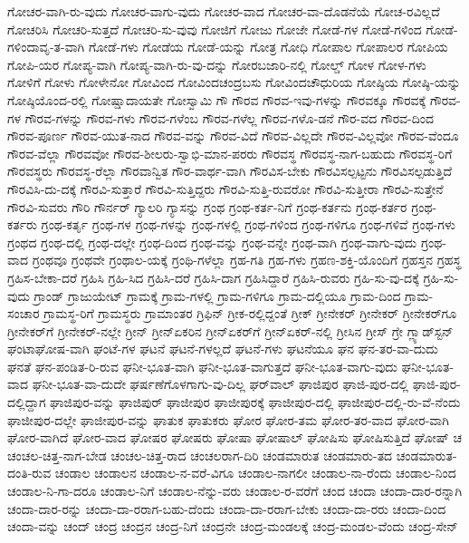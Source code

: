 {ಗೋಚರ-ವಾಗಿ-ರು-ವುದು
ಗೋಚರ-ವಾಗು-ವುದು
ಗೋಚರ-ವಾದ
ಗೋಚರ-ವಾ-ದೊಡನೆಯೆ
ಗೋಚ-ರವಿಲ್ಲದೆ
ಗೋಚರಿಸಿ
ಗೋಚರಿ-ಸುತ್ತದೆ
ಗೋಚರಿ-ಸು-ವುವು
ಗೋಜಿಗೆ
ಗೋಜು
ಗೋಜೇ
ಗೋಡೆ-ಗಳ
ಗೋಡೆ-ಗಳಿಂದ
ಗೋಡೆ-ಗಳಿಂದಾವೃ-ತ-ವಾಗಿ
ಗೋಡೆ-ಗಳು
ಗೋಡೆಯ
ಗೋಡೆ-ಯನ್ನು
ಗೋತ್ರ
ಗೋಧಿ
ಗೋಪಾಲ
ಗೋಪಾಲರ
ಗೋಪಿಯ
ಗೋಪಿ-ಯರ
ಗೋಪ್ಯ-ವಾಗಿ
ಗೋಪ್ಯ-ವಾಗಿ-ರು-ವು-ದನ್ನು
ಗೋರಬಜಾರಿ-ನಲ್ಲಿ
ಗೋಲ್ಡ್
ಗೋಳ
ಗೋಳ-ಗಳು
ಗೋಳಿಗೆ
ಗೋಳು
ಗೋಳೇನೋ
ಗೋವಿಂದ
ಗೋವಿಂದಚಂದ್ರಬಸು
ಗೋವಿಂದಚೌಧುರಿಯ
ಗೋಷ್ಠಿಯ
ಗೋಷ್ಠಿ-ಯನ್ನು
ಗೋಷ್ಠಿಯೊಂದ-ರಲ್ಲಿ
ಗೋಷ್ಷಾದಾಯತೇ
ಗೋಸ್ವಾಮಿ
ಗೌ
ಗೌರವ
ಗೌರವ-ಇವು-ಗಳನ್ನು
ಗೌರವಕ್ಕೂ
ಗೌರವಕ್ಕೆ
ಗೌರವ-ಗಳ
ಗೌರವ-ಗಳನ್ನು
ಗೌರವ-ಗಳು
ಗೌರವ-ಗಳೆಂಬ
ಗೌರವ-ಗಳೆಲ್ಲ
ಗೌರವ-ಗಳೊ-ಡನೆ
ಗೌರ-ವದ
ಗೌರವ-ದಿಂದ
ಗೌರವ-ಪೂರ್ಣ
ಗೌರವ-ಯುತ-ನಾದ
ಗೌರವ-ವನ್ನು
ಗೌರವ-ವಿದೆ
ಗೌರವ-ವಿಲ್ಲದೇ
ಗೌರವ-ವಿಲ್ಲವೋ
ಗೌರವ-ವೆಂದೂ
ಗೌರವ-ವೆಲ್ಲಾ
ಗೌರವವೋ
ಗೌರವ-ಶೀಲರು-ಸ್ವಾಭಿ-ಮಾನ-ಪರರು
ಗೌರವಸ್ಥ
ಗೌರವಸ್ಥ-ನಾಗ-ಬಹುದು
ಗೌರವಸ್ಥ-ರಿಗೆ
ಗೌರವಸ್ಥರು
ಗೌರವಸ್ಥ-ರೆಲ್ಲಾ
ಗೌರವಾನ್ವಿತ
ಗೌರ-ವಾರ್ಥ-ವಾಗಿ
ಗೌರವಿಸ-ಬೇಕು
ಗೌರವಿಸಲ್ಪಟ್ಟನು
ಗೌರವಿಸಲ್ಪಡುತ್ತಿದೆ
ಗೌರವಿಸಿ-ದು-ದಕ್ಕೆ
ಗೌರವಿ-ಸುತ್ತಾರೆ
ಗೌರವಿ-ಸುತ್ತಿದ್ದರು
ಗೌರವಿ-ಸುತ್ತಿ-ರುವರೋ
ಗೌರವಿ-ಸುತ್ತೀರಾ
ಗೌರವಿ-ಸುತ್ತೇನೆ
ಗೌರವಿ-ಸುವರು
ಗೌರಿ
ಗೌರ್ನ‌ರ್
ಗ್ಯಾಲರಿ
ಗ್ಯಾಸನ್ನು
ಗ್ರಂಥ
ಗ್ರಂಥ-ಕರ್ತ-ನಿಗೆ
ಗ್ರಂಥ-ಕರ್ತನು
ಗ್ರಂಥ-ಕರ್ತರ
ಗ್ರಂಥ-ಕರ್ತರು
ಗ್ರಂಥ-ಕರ್ತೃ
ಗ್ರಂಥ-ಗಳ
ಗ್ರಂಥ-ಗಳನ್ನು
ಗ್ರಂಥ-ಗಳಲ್ಲಿ
ಗ್ರಂಥ-ಗಳಿಂದ
ಗ್ರಂಥ-ಗಳಿಗೂ
ಗ್ರಂಥ-ಗಳಿವೆ
ಗ್ರಂಥ-ಗಳು
ಗ್ರಂಥದ
ಗ್ರಂಥ-ದಲ್ಲಿ
ಗ್ರಂಥ-ದಲ್ಲೇ
ಗ್ರಂಥ-ದಿಂದ
ಗ್ರಂಥ-ವನ್ನು
ಗ್ರಂಥ-ವನ್ನೇ
ಗ್ರಂಥ-ವಾಗಿ
ಗ್ರಂಥ-ವಾಗು-ವುದು
ಗ್ರಂಥ-ವಾದ
ಗ್ರಂಥವೂ
ಗ್ರಂಥವೇ
ಗ್ರಂಥಾಲ-ಯಕ್ಕೆ
ಗ್ರಂಥಿ-ಗಳೆಲ್ಲಾ
ಗ್ರಹ-ಗತಿ
ಗ್ರಹ-ಗಳು
ಗ್ರಹಣ-ಶಕ್ತಿ-ಯೊಂದಿಗೆ
ಗ್ರಹಸ್ತನ
ಗ್ರಹಸ್ಥ
ಗ್ರಹಿಸ-ಬೇಕಾ-ದರೆ
ಗ್ರಹಿಸಿ
ಗ್ರಹಿ-ಸಿದ
ಗ್ರಹಿಸಿ-ದರೆ
ಗ್ರಹಿಸಿ-ದಾಗ
ಗ್ರಹಿಸಿದ್ದಾರೆ
ಗ್ರಹಿಸಿ-ರುವರು
ಗ್ರಹಿ-ಸು-ವು-ದಕ್ಕೆ
ಗ್ರಹಿ-ಸು-ವುದು
ಗ್ರಾಂಡ್
ಗ್ರಾಜುಯೇಟ್
ಗ್ರಾಮಕ್ಕೆ
ಗ್ರಾಮ-ಗಳಲ್ಲಿ
ಗ್ರಾಮ-ಗಳಿಗೂ
ಗ್ರಾಮ-ದಲ್ಲಿಯೂ
ಗ್ರಾಮ-ದಿಂದ
ಗ್ರಾಮ-ಸಂಚಾರ
ಗ್ರಾಮಸ್ಥ-ರಿಗೆ
ಗ್ರಾಮಸ್ಥರು
ಗ್ರಾಮಾಂತರ
ಗ್ರಿಫಿನ್
ಗ್ರೀಕ-ರಲ್ಲಿದ್ದಂತೆ
ಗ್ರೀಕ್
ಗ್ರೀನೇಕರ್
ಗ್ರೀನೇಕರ್‌
ಗ್ರೀನೇಕರ್‌ಗೂ
ಗ್ರೀನೇಕರ್‌ಗೆ
ಗ್ರೀನೇಕರ್‌-ನಲ್ಲೇ
ಗ್ರೀನ್
ಗ್ರೀನ್‌ಏಕರಿನ
ಗ್ರೀನ್‌ಏಕರ್‌ಗೆ
ಗ್ರೀನ್‌ಏಕರ್‌-ನಲ್ಲಿ
ಗ್ರೀಸಿನ
ಗ್ರೀಸ್
ಗ್ರೇ
ಗ್ಲ್ಯಾಡ್‌ಸ್ಟನ್
ಘಂಟಾಘೋಷ-ವಾಗಿ
ಘಂಟೆ-ಗಳ
ಘಟನೆ
ಘಟನೆ-ಗಳಲ್ಲದೆ
ಘಟನೆ-ಗಳು
ಘಟನೆಯೂ
ಘನ
ಘನ-ತರ-ವಾ-ದುದು
ಘನತೆ
ಘನ-ಪಂಡಿತ-ರಿ-ರುವ
ಘನೀ-ಭೂತ-ವಾಗಿ
ಘನೀ-ಭೂತ-ವಾಗುತ್ತದೆ
ಘನೀ-ಭೂತ-ವಾಗು-ವುದು
ಘನೀ-ಭೂತ-ವಾದ
ಘನೀ-ಭೂತ-ವಾ-ದುದೇ
ಘರ್ಷಣೆಗೊಳಗಾಗು-ವು-ದಿಲ್ಲ
ಘರ್‌ವಾಲ್
ಘಾಜಿಪುರ
ಘಾಜಿ-ಪುರ-ದಲ್ಲಿ
ಘಾಜಿ-ಪುರ-ದಲ್ಲಿದ್ದಾಗ
ಘಾಜಿಪುರ-ವನ್ನು
ಘಾಜಿಪುರ್
ಘಾಜೀಪುರ
ಘಾಜೀಪುರಕ್ಕೆ
ಘಾಜೀಪುರ-ದಲ್ಲಿ
ಘಾಜೀಪುರ-ದಲ್ಲಿ-ರು-ವೆ-ನೆಂದು
ಘಾಜೀಪುರ-ದಲ್ಲೇ
ಘಾಜೀಪುರ-ವನ್ನು
ಘಾತುಕ
ಘಾತುಕರು
ಘೋರ
ಘೋರ-ತಮ
ಘೋರ-ತರ-ವಾದ
ಘೋರ-ವಾಗಿ
ಘೋರ-ವಾಗಿದೆ
ಘೋರ-ವಾದ
ಘೋಷರ
ಘೋಷರು
ಘೋಷಾ
ಘೋಷಾಲ್
ಘೋಷಿಸು
ಘೋಷಿಸುತ್ತಿದೆ
ಘೋಷ್
ಚ
ಚಂಚಲ-ಚಿತ್ತ-ನಾಗ-ಬೇಡ
ಚಂಚಲ-ಚಿತ್ತ-ರಾದ
ಚಂಚಲರಾಗ-ದಿರಿ
ಚಂಡಮಾರುತ
ಚಂಡಮಾರು-ತದ
ಚಂಡಮಾರುತ-ದಂತಿ-ರುವ
ಚಂಡಾಲ
ಚಂಡಾಲನ
ಚಂಡಾಲ-ನ-ವರೆ-ವಿಗೂ
ಚಂಡಾಲ-ನಾಗಲೀ
ಚಂಡಾಲ-ನಾ-ರೆಂದು
ಚಂಡಾಲ-ನಿಂದ
ಚಂಡಾಲ-ನಿ-ಗಾ-ದರೂ
ಚಂಡಾಲ-ನಿಗೆ
ಚಂಡಾಲ-ನೆನ್ನು-ವರು
ಚಂಡಾಲ-ರ-ವರೆಗೆ
ಚಂದ
ಚಂದಾ
ಚಂದಾ-ದಾರ-ರನ್ನಾಗಿ
ಚಂದಾ-ದಾರ-ರನ್ನು
ಚಂದಾ-ದಾ-ರರಾಗ-ಬಹು-ದೆಂದು
ಚಂದಾ-ದಾ-ರರಾಗ-ಬೇಕು
ಚಂದಾ-ದಾ-ರರು
ಚಂದಾ-ದಿಂದ
ಚಂದಾ-ವನ್ನು
ಚಂದ್
ಚಂದ್ರ
ಚಂದ್ರನ
ಚಂದ್ರ-ನಿಗೆ
ಚಂದ್ರನೇ
ಚಂದ್ರ-ಮಂಡಲಕ್ಕೆ
ಚಂದ್ರ-ಮಂಡಲ-ವೆಂದು
ಚಂದ್ರ-ಸೇನ್
}
